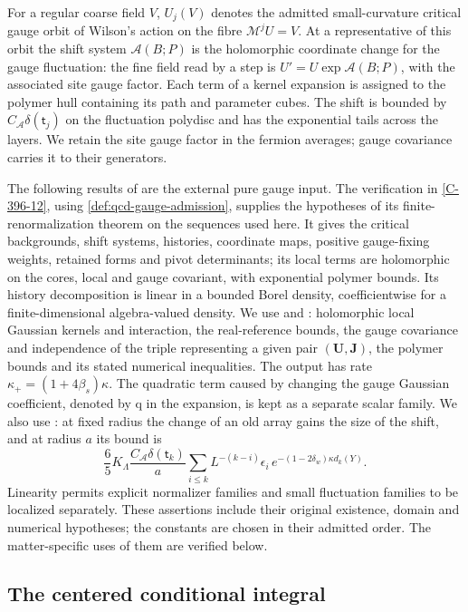\documentclass[11pt,letterpaper,reqno]{amsart}
\theoremstyle{definition}
\theoremstyle{remark}
\begin{document}
For a regular coarse field $V$, $U_j(V)$ denotes the admitted
small-curvature critical gauge orbit of Wilson's action on
the fibre $\mathcal M^jU=V$. At a representative of this
orbit the shift system $\mathcal A(B;P)$ is the
holomorphic coordinate change for the gauge fluctuation:
the fine field read by a step is
$U'=U\exp\mathcal A(B;P)$, with the associated site gauge
factor. Each term of a kernel expansion is assigned to the
polymer hull containing its path and parameter cubes.
The shift is bounded by
$C_{\mathcal A}\delta(\mathsf t_j)$ on the fluctuation
polydisc and has the exponential tails across
the layers. We retain the site gauge factor in the
fermion averages; gauge covariance carries it to their
generators.

The following results of \cite{YMM1} are the external pure gauge
input. The verification in \cref{C-396-12}, using
\cref{def:qcd-gauge-admission}, supplies the hypotheses of its
finite-renormalization theorem \cite[Thm.~C]{YMM1} on the sequences used here.
It gives the critical backgrounds, shift systems, histories,
coordinate maps, positive gauge-fixing weights, retained
forms and pivot determinants; its local terms are
holomorphic on the cores, local and gauge covariant, with
exponential polymer bounds. Its history decomposition is
linear in a bounded Borel density, coefficientwise for a
finite-dimensional algebra-valued density.
We use \cite[Prop.~4.54]{YMM1} and \cite[Def.~4.53]{YMM1}: holomorphic local Gaussian
kernels and interaction, the real-reference bounds, the
gauge covariance and independence of the triple representing
a given pair $(\mathbf U,\mathbf J)$, the polymer
bounds and its stated numerical inequalities. The output
has rate $\kappa_+=(1+4\beta_s)\kappa$. The quadratic
term caused by changing the gauge Gaussian coefficient,
denoted by q in the expansion, is kept as a separate scalar family.
We also use \cite[Prop.~4.52]{YMM1}: at fixed radius the change of an old array gains
the size of the shift, and at radius $a$ its bound is
\[
 \frac65K_\Lambda\frac{C_{\mathcal A}\delta(\mathsf t_k)}a
 \sum_{i\le k}L^{-(k-i)}\epsilon_i\,
 e^{-(1-2\delta_w)\kappa d_k(Y)}.
\]
Linearity permits explicit normalizer families and small
fluctuation families to be localized separately.
These assertions include their original existence, domain
and numerical hypotheses; the constants are chosen in
their admitted order. The matter-specific uses of them
are verified below.

\subsection{The centered conditional integral}
\end{document}
